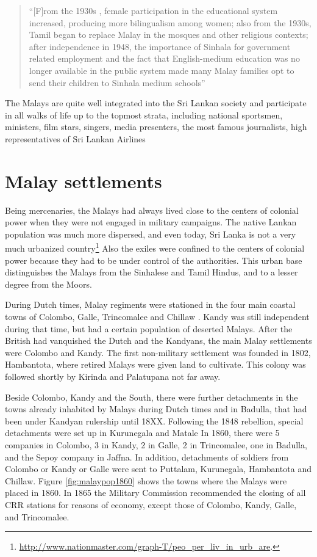 \begin{quotation}
    ``[F]rom the 1930s , female participation in the educational system increased, producing more bilingualism among women; also from the 1930s, Tamil began to replace Malay in the mosques and other religious contexts; after independence in 1948, the importance of Sinhala for government related employment and the fact that English-medium education was no longer available in the public system made many Malay families opt to send their children to Sinhala medium schools''\citet[3]{SmithEtAl2004}
\end{quotation}


The Malays are quite well integrated into the Sri Lankan society and participate in all walks of life up to the topmost strata, including national sportsmen, ministers, film stars, singers, media presenters, the most famous journalists, high representatives of Sri Lankan Airlines
\section{Malay settlements}\label{sec:slmbg:Malaysettlements}
Being mercenaries, the Malays had always lived close to the centers of colonial power when they were not engaged in military campaigns. The native Lankan population was much more dispersed, and even today, Sri Lanka is not a very much urbanized country\footnote{   \url{http://www.nationmaster.com/graph-T/peo_per_liv_in_urb_are}.} Also the exiles were confined to the centers of colonial power because they had to be under control of the authorities. This urban base distinguishes the Malays from the Sinhalese and Tamil Hindus, and to a lesser degree from the Moors.

During Dutch times, Malay regiments were stationed in the four main coastal towns of Colombo, Galle, Trincomalee and Chillaw \citep{abc} .
Kandy was still independent during that time, but had a certain population of deserted Malays.
After the British had vanquished the Dutch and the Kandyans, the main Malay settlements were Colombo and Kandy. The first non-military settlement was founded in 1802, Hambantota, where retired Malays were given land to cultivate\kuckn. This colony  was followed shortly by Kirinda and Palatupana not far away.

Beside Colombo, Kandy and the South, there were further
detachments in the towns already inhabited by Malays during Dutch
times and in Badulla, that had been under Kandyan rulership until
18XX. \kuckn Following the 1848 rebellion, special detachments
were set up in Kurunegala and Matale In 1860, there were 5
companies in Colombo, 3 in Kandy, 2 in Galle, 2 in Trincomalee,
one in Badulla, and  the Sepoy company in Jaffna. In addition,
detachments of soldiers from Colombo or Kandy or Galle were sent
to Puttalam, Kurunegala, Hambantota and Chillaw. Figure
\ref{fig:malaypop1860} shows the towns where the Malays were
placed in 1860. In 1865 the Military Commission recommended the
closing of all CRR stations for reasons of economy, except those
of Colombo, Kandy, Galle, and Trincomalee.

